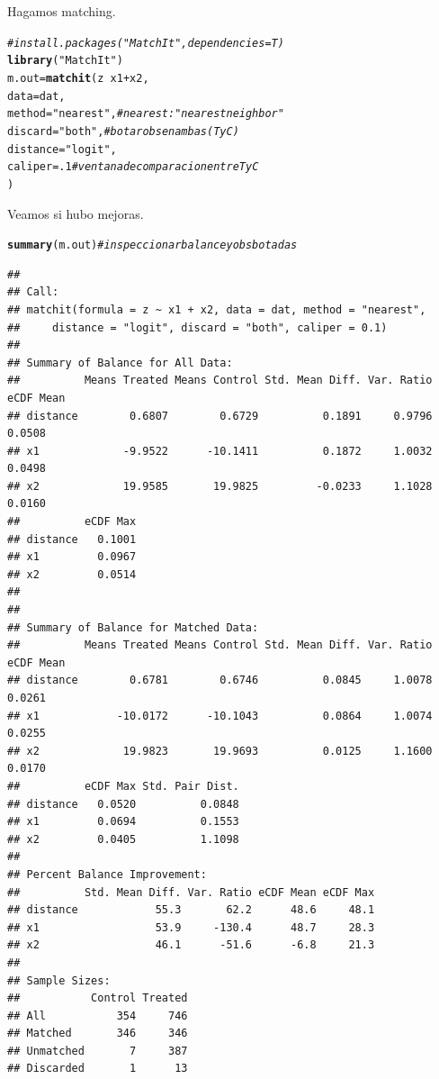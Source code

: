\documentclass[onesided]{article}\usepackage[]{graphicx}\usepackage[]{color}
\makeatletter
\newcommand{\hlnum}[1]{\textcolor[rgb]{0.686,0.059,0.569}{#1}}%
\newcommand{\hlstr}[1]{\textcolor[rgb]{0.192,0.494,0.8}{#1}}%
\newcommand{\hlcom}[1]{\textcolor[rgb]{0.678,0.584,0.686}{\textit{#1}}}%
\newcommand{\hlopt}[1]{\textcolor[rgb]{0,0,0}{#1}}%
\newcommand{\hlstd}[1]{\textcolor[rgb]{0.345,0.345,0.345}{#1}}%
\newcommand{\hlkwb}[1]{\textcolor[rgb]{0.69,0.353,0.396}{#1}}%
\newcommand{\hlkwc}[1]{\textcolor[rgb]{0.333,0.667,0.333}{#1}}%
\newcommand{\hlkwd}[1]{\textcolor[rgb]{0.737,0.353,0.396}{\textbf{#1}}}%
\newenvironment{kframe}{%
 \def\at@end@of@kframe{}%
 \ifinner\ifhmode%
  \def\at@end@of@kframe{\end{minipage}}%
  \begin{minipage}{\columnwidth}%
 \fi\fi%
 \def\FrameCommand##1{\hskip\@totalleftmargin \hskip-\fboxsep
 \colorbox{shadecolor}{##1}\hskip-\fboxsep
     \hskip-\linewidth \hskip-\@totalleftmargin \hskip\columnwidth}%
 \MakeFramed {\advance\hsize-\width
   \@totalleftmargin\z@ \linewidth\hsize
   \@setminipage}}%
 {\par\unskip\endMakeFramed%
 \at@end@of@kframe}
\newenvironment{knitrout}{}{} %
\makeatother
\begin{document}
Hagamos matching.

\begin{knitrout}
\color{fgcolor}\begin{kframe}
\begin{alltt}
\hlcom{# install.packages("MatchIt", dependencies = T)}
\hlkwd{library}\hlstd{(}\hlstr{"MatchIt"}\hlstd{)}
\hlstd{m.out} \hlkwb{=} \hlkwd{matchit}\hlstd{(z} \hlopt{~} \hlstd{x1} \hlopt{+} \hlstd{x2,}
\hlkwc{data} \hlstd{= dat,}
\hlkwc{method} \hlstd{=} \hlstr{"nearest"}\hlstd{,} \hlcom{# nearest: "nearest neighbor"}
\hlkwc{discard} \hlstd{=} \hlstr{"both"}\hlstd{,}  \hlcom{# botar obs en ambas (T y C)}
\hlkwc{distance} \hlstd{=} \hlstr{"logit"}\hlstd{,}
\hlkwc{caliper} \hlstd{=} \hlnum{.1} \hlcom{# ventana de comparacion entre T y C}
\hlstd{)}
\end{alltt}
\end{kframe}
\end{knitrout}

Veamos si hubo mejoras.

\begin{knitrout}
\color{fgcolor}\begin{kframe}
\begin{alltt}
\hlkwd{summary}\hlstd{(m.out)} \hlcom{# inspeccionar balance y obs botadas}
\end{alltt}
\begin{verbatim}
## 
## Call:
## matchit(formula = z ~ x1 + x2, data = dat, method = "nearest", 
##     distance = "logit", discard = "both", caliper = 0.1)
## 
## Summary of Balance for All Data:
##          Means Treated Means Control Std. Mean Diff. Var. Ratio eCDF Mean
## distance        0.6807        0.6729          0.1891     0.9796    0.0508
## x1             -9.9522      -10.1411          0.1872     1.0032    0.0498
## x2             19.9585       19.9825         -0.0233     1.1028    0.0160
##          eCDF Max
## distance   0.1001
## x1         0.0967
## x2         0.0514
## 
## 
## Summary of Balance for Matched Data:
##          Means Treated Means Control Std. Mean Diff. Var. Ratio eCDF Mean
## distance        0.6781        0.6746          0.0845     1.0078    0.0261
## x1            -10.0172      -10.1043          0.0864     1.0074    0.0255
## x2             19.9823       19.9693          0.0125     1.1600    0.0170
##          eCDF Max Std. Pair Dist.
## distance   0.0520          0.0848
## x1         0.0694          0.1553
## x2         0.0405          1.1098
## 
## Percent Balance Improvement:
##          Std. Mean Diff. Var. Ratio eCDF Mean eCDF Max
## distance            55.3       62.2      48.6     48.1
## x1                  53.9     -130.4      48.7     28.3
## x2                  46.1      -51.6      -6.8     21.3
## 
## Sample Sizes:
##           Control Treated
## All           354     746
## Matched       346     346
## Unmatched       7     387
## Discarded       1      13
\end{verbatim}
\end{kframe}
\end{knitrout}
\end{document}
